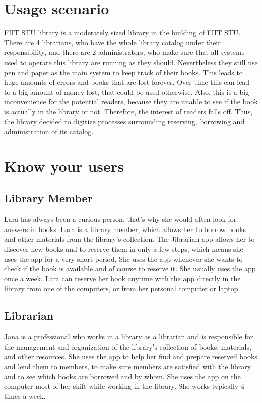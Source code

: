 \documentclass[11pt,twoside,a4paper]{article}
\begin{document}
\section{Usage scenario}
FIIT STU library is a moderately sized library in the building of FIIT STU.
There are 4 librarians, who have the whole library catalog under their
responsibility, and there are 2 administrators, who make sure that all
systems used to operate this library are running as they should. Nevertheless
they still use pen and paper as the main system to keep track of their books.
This leads to huge amounts of errors and books that are lost forever. Over
time this can lead to a big amount of money lost, that could be used otherwise.
Also, this is a big inconvenience for the potential readers, because they
are unable to see if the book is actually in the library or not. Therefore,
the interest of readers falls off. Thus, the library decided to digitize
processes surrounding reserving, borrowing and administration of its
catalog.

\section{Know your users}

\subsection*{Library Member}
Lara has always been a curious person, that's why she would often look for
answers in books. Lara is a library member, which allows her to borrow books
and other materials from the library's collection. The Jibrarian app allows
her to discover new books and to reserve them in only a few steps, which
means she uses the app for a very short period. She uses the app whenever she
wants to check if the book is available and of course to reserve it. She
usually uses the app once a week. Lara can reserve her book anytime with the
app directly in the library from one of the computers, or from her personal
computer or laptop.

\subsection*{Librarian}
Jana is a professional who works in a library as a librarian and is
responsible for the management and organization of the library's collection
of books, materials, and other resources. She uses the app to help her find
and prepare reserved books and lend them to members, to make sure members are
satisfied with the library and to see which books are borrowed and by whom.
She uses the app on the computer most of her shift while working in the
library. She works typically 4 times a week.
\end{document}
